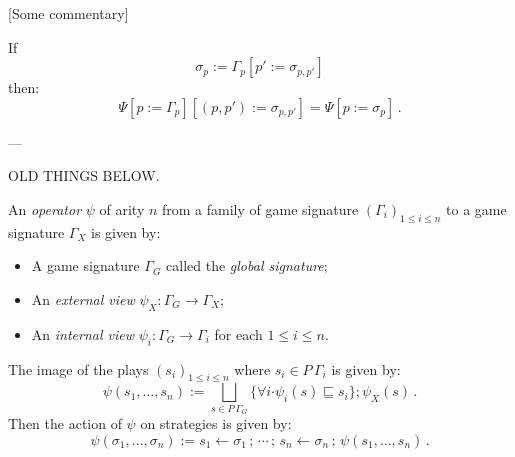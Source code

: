 \documentclass[format=sigplan,authordraft]{acmart}
\newcommand{\bdot}{\boldsymbol{\cdot}}
\begin{document}
[Some commentary]

\begin{lemma}

If
\[
  \sigma_p := \Gamma_p[p' := \sigma_{p,p'}]
\]
then:
\[
  \Psi[p := \Gamma_p][(p, p') := \sigma_{p, p'}] =
  \Psi[p := \sigma_p] \,.
\]
\end{lemma}


---

OLD THINGS BELOW.

\begin{definition}
An \emph{operator} $\psi$ of arity $n$
from a family of game signature $(\Gamma_i)_{1 \le i \le n}$
to a game signature $\Gamma_X$
is given by:
\begin{itemize}
\item A game signature $\Gamma_G$ called the \emph{global signature};
\item An \emph{external view} $\psi_X : \Gamma_G \rightarrow \Gamma_X$;
\item An \emph{internal view} $\psi_i : \Gamma_G \rightarrow \Gamma_i$
  for each $1 \le i \le n$.
\end{itemize}
The image of the plays $(s_i)_{1 \le i \le n}$
where $s_i \in P \, {\Gamma_i}$
is given by:
\[
  \psi(s_1, \ldots, s_n) :=
    \bigsqcup_{s \in P \, {\Gamma_G}}
    \{ \forall i \bdot \psi_i(s) \sqsubseteq s_i \} ;
    \psi_X(s) \,.
\]
Then the action of $\psi$ on strategies is given by:
\[
  \psi(\sigma_1, \ldots, \sigma_n) :=
    s_1 \leftarrow \sigma_1 \, ; \, {\cdots} \, ; \,
    s_n \leftarrow \sigma_n \, ; \,
    \psi(s_1, \ldots, s_n) \,.
\]
\end{definition}

\end{document}
